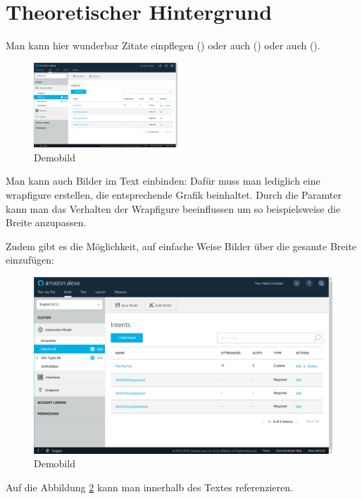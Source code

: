 \section{Theoretischer Hintergrund}
\label{sec:theorie}
Man kann hier wunderbar Zitate einpflegen (\citealp{Statista2018}) oder auch (\cite{Statista2018}) oder auch (\citeauthor{Statista2018}).

\begin{figure}
    \includegraphics[width=0.48\textwidth]{resources/images/amazon_dev_console.png}
    \caption{Demobild}
    \label{fig:demobild2}
\end{figure}

Man kann auch Bilder im Text einbinden: Dafür muss man lediglich eine wrapfigure erstellen, die entsprechende Grafik beinhaltet. Durch die Paramter kann man das Verhalten der Wrapfigure beeinflussen um so beispielsweise die Breite anzupassen.

Zudem gibt es die Möglichkeit, auf einfache Weise Bilder über die gesamte Breite einzufügen:
\begin{figure} [ht]
        \includegraphics[width=\textwidth]{resources/images/amazon_dev_console.png}
        \caption{Demobild}
        \label{fig:demobild}
\end{figure}

Auf die Abbildung \ref{fig:demobild} kann man innerhalb des Textes referenzieren.